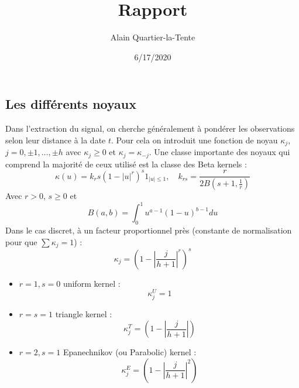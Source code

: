 \documentclass[
  12pt,
  ,
  french]{article}
\title{Rapport}
\author{Alain Quartier-la-Tente}
\date{6/17/2020}
\begin{document}
\maketitle

{
\setcounter{tocdepth}{2}
\tableofcontents
}
\hypertarget{les-diffuxe9rents-noyaux}{%
\subsection{Les différents noyaux}\label{les-diffuxe9rents-noyaux}}

Dans l'extraction du signal, on cherche généralement à pondérer les observations selon leur distance à la date \(t\).
Pour cela on introduit une fonction de noyau \(\kappa_j\), \(j=0,\pm1,\dots,\pm h\) avec \(\kappa_j \geq0\) et \(\kappa_j=\kappa_{-j}\).
Une classe importante des noyaux qui comprend la majorité de ceux utilisé est la classe des Beta kernels :
\[
\kappa(u)=k_rs\left(1-\lvert u\rvert^r
\right)^s
1_{\lvert u\rvert\leq 1}
,\quad k_{rs}=\frac{r}{
2B\left(s+1,\frac 1 r\right)
}
\]
Avec \(r>0\), \(s\geq 0\) et
\[
B(a,b)=\int_0^1u^{a-1}(1-u)^{b-1}du
\]
Dans le cas discret, à un facteur proportionnel près (constante de normalisation pour que \(\sum\kappa_j=1\)) :
\[
\kappa_j = \left(
  1-
  \left\lvert
  \frac j {h+1}
  \right\lvert^r
\right)^s
\]

\begin{multicols}{2}
\begin{itemize}
\item $r=1,s=0$ uniform kernel : 
$$\kappa_j^U=1$$

\item $r=s=1$ triangle kernel :
$$\kappa_j^T=\left(
  1-
  \left\lvert
  \frac j {h+1}
  \right\lvert
\right)$$

\item $r=2,s=1$  Epanechnikov (ou Parabolic) kernel :
$$\kappa_j^E=\left(
  1-
  \left\lvert
  \frac j {h+1}
  \right\lvert^2
\right)$$
\end{itemize}
\end{multicols}
\end{document}
